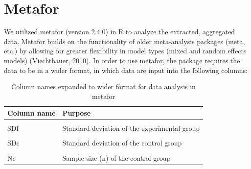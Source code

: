 \documentclass[12pt,twoside]{reedthesis}
\begin{document}
\hypertarget{metafor}{%
\section{Metafor}\label{metafor}}

We utilized metafor (version 2.4.0) in R to analyze the extracted, aggregated data. Metafor builds on the functionality of older meta-analysis packages (meta, etc.) by allowing for greater flexibility in model types (mixed and random effects models) (Viechtbauer, 2010). In order to use metafor, the package requires the data to be in a wider format, in which data are input into the following columns:
\begin{table}[!h]

\caption{\label{tab:unnamed-chunk-10}Column names expanded to wider format for data analysis in metafor}
\centering
\begin{tabular}[t]{ll}
\toprule
\textbf{Column name} & \textbf{Purpose}\\
\midrule
\cellcolor{gray!6}{Mf} & \cellcolor{gray!6}{Mean of experimental group}\\
SDf & Standard deviation of the experimental group\\
\cellcolor{gray!6}{Mc} & \cellcolor{gray!6}{Mean of the control group}\\
SDc & Standard deviation of the control group\\
\cellcolor{gray!6}{Nf} & \cellcolor{gray!6}{Sample size (n) of the experimental group}\\
\addlinespace
Nc & Sample size (n) of the control group\\
\bottomrule
\end{tabular}
\end{table}
\linebreak
\end{document}
